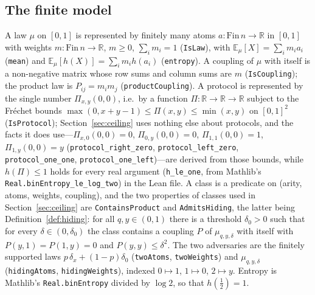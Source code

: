 \documentclass[11pt,a4paper]{article}
\theoremstyle{definition}
\theoremstyle{remark}
\newcommand{\E}{\mathbb{E}}
\newcommand{\R}{\mathbb{R}}
\newcommand{\ent}{h}
\begin{document}
\subsection{The finite model}\label{app:lean:model}
A law $\mu$ on $[0,1]$ is represented by finitely many atoms $a:\mathrm{Fin}\,n\to\R$ in
$[0,1]$ with weights $m:\mathrm{Fin}\,n\to\R$, $m\ge0$, $\sum_im_i=1$ (\texttt{IsLaw}), with
$\E_\mu[X]=\sum_im_ia_i$ (\texttt{mean}) and $\E_\mu[\ent(X)]=\sum_im_i\ent(a_i)$
(\texttt{entropy}). A coupling of $\mu$ with itself is a non-negative matrix whose row sums
and column sums are $m$ (\texttt{IsCoupling}); the product law is
$P_{ij}=m_im_j$ (\texttt{productCoupling}). A protocol is represented by the single number
$\Pi_{x,y}(0,0)$, i.e.\ by a function $\Pi:\R\to\R\to\R$ subject to the Fr\'echet bounds
$\max(0,x+y-1)\le\Pi(x,y)\le\min(x,y)$ on $[0,1]^2$ (\texttt{IsProtocol}); Section~\ref{sec:ceiling}
uses nothing else about protocols, and the facts it does use---$\Pi_{x,0}(0,0)=0$,
$\Pi_{0,y}(0,0)=0$, $\Pi_{1,1}(0,0)=1$, $\Pi_{1,y}(0,0)=y$ (\texttt{protocol\_right\_zero}, \texttt{protocol\_left\_zero}, \texttt{protocol\_one\_one}, \texttt{protocol\_one\_left})---are derived from those bounds, while $\ent(\Pi)\le1$ holds for every real argument (\texttt{h\_le\_one}, from Mathlib's \texttt{Real.binEntropy\_le\_log\_two})
in the Lean file. A class is a predicate on (arity, atoms, weights, coupling), and the two
properties of classes used in Section~\ref{sec:ceiling} are \texttt{ContainsProduct} and
\texttt{AdmitsHiding}, the latter being Definition~\ref{def:hiding}: for all $q,y\in(0,1)$
there is a threshold $\delta_0>0$ such that for every $\delta\in(0,\delta_0)$ the class
contains a coupling $P$ of $\mu_{q,y,\delta}$ with itself with $P(y,1)=P(1,y)=0$ and
$P(y,y)\le\delta^2$. The two adversaries are the finitely supported laws
$p\,\delta_x+(1-p)\delta_0$ (\texttt{twoAtoms}, \texttt{twoWeights}) and $\mu_{q,y,\delta}$
(\texttt{hidingAtoms}, \texttt{hidingWeights}), indexed $0\mapsto1$, $1\mapsto0$,
$2\mapsto y$. Entropy is Mathlib's \texttt{Real.binEntropy} divided by $\log2$, so that
$\ent(\tfrac12)=1$.
\end{document}
